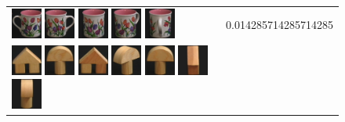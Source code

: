 \begin{figure}[tbp]
\begin{center}
\begin{tabular}{m{11cm} | m{3cm} |}
\includegraphics[width=1cm]{coil/beeld-7.eps}
\includegraphics[width=1cm]{coil/beeld-6.eps}
\includegraphics[width=1cm]{coil/beeld-8.eps}
\includegraphics[width=1cm]{coil/beeld-9.eps}
\includegraphics[width=1cm]{coil/beeld-11.eps}
& {\scriptsize 0.014285714285714285}
\\
\includegraphics[width=1cm]{coil/beeld-42.eps}
\includegraphics[width=1cm]{coil/beeld-0.eps}
\includegraphics[width=1cm]{coil/beeld-43.eps}
\includegraphics[width=1cm]{coil/beeld-3.eps}
\includegraphics[width=1cm]{coil/beeld-1.eps}
\includegraphics[width=1cm]{coil/beeld-44.eps}
\includegraphics[width=1cm]{coil/beeld-5.eps}

\end{tabular}
\end{center}
\end{figure}
